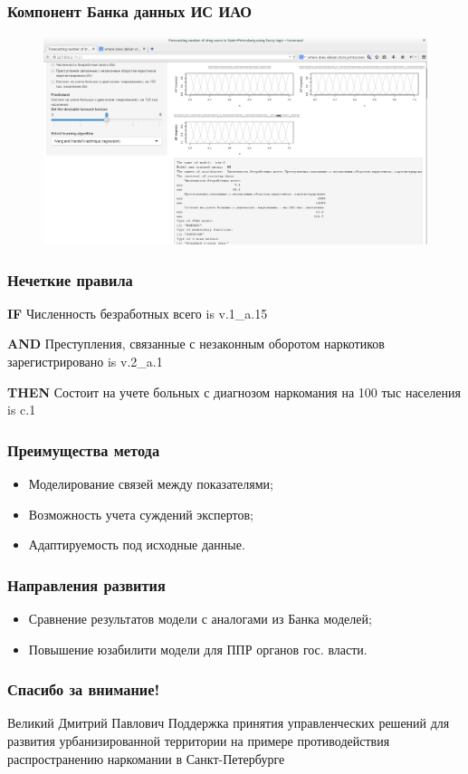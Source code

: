 \documentclass[t]{beamer}  %
\begin{document}
\begin{frame}
    \frametitle{Компонент Банка данных ИС ИАО}
    \begin{figure}
        \centering
        \includegraphics[width=\textwidth]{screenshot3.png}
    \end{figure}
\end{frame}
\begin{frame}
    \frametitle{Нечеткие правила}
    \textbf{IF} Численность безработных всего is \alert{v.1\_a.15} 
    
    \textbf{AND} Преступления, связанные с незаконным оборотом наркотиков зарегистрировано is
    \alert{v.2\_a.1} 

    \textbf{THEN} Состоит на учете больных с диагнозом наркомания на 100 тыс населения is
    \alert{c.1}
\end{frame}
\begin{frame}
    \frametitle{Преимущества метода}
    \begin{itemize}
        \item Моделирование связей между показателями;
        \item Возможность учета суждений экспертов;
        \item Адаптируемость под исходные данные.
    \end{itemize}

\end{frame}
\begin{frame}
    \frametitle{Направления развития}
    \begin{itemize}
        \item Сравнение результатов модели с аналогами из Банка моделей;
        \item Повышение юзабилити модели для ППР органов гос. власти.
    \end{itemize}
\end{frame}
\begin{frame}
    \frametitle{Спасибо за внимание!}
    \begin{block}{Великий Дмитрий Павлович}
        Поддержка принятия управленческих решений для развития урбанизированной
        территории на примере противодействия распространению наркомании в
        Санкт-Петербурге
    \end{block}
\end{frame}
\end{document}
